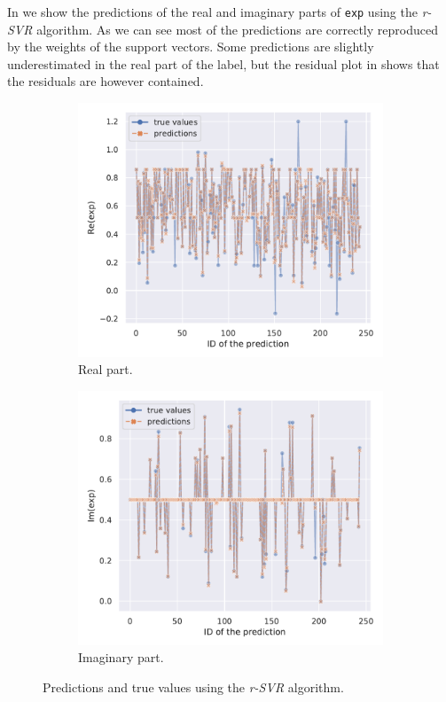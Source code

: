 In  we show the predictions of the real and imaginary parts of \texttt{exp} using the \emph{r-SVR} algorithm.
As we can see most of the predictions are correctly reproduced by the weights of the support vectors.
Some predictions are slightly underestimated in the real part of the label, but the residual plot in  shows that the residuals are however contained.

\begin{figure}[htbp]
  \centering
  \begin{subfigure}{0.45\textwidth}
    \centering
    \includegraphics[width=\linewidth]{img/svr_test_exp_re_plot}
    \caption{Real part.}
  \end{subfigure}
  \begin{subfigure}{0.45\textwidth}
    \centering
    \includegraphics[width=\linewidth]{img/svr_test_exp_im_plot}
    \caption{Imaginary part.}
  \end{subfigure}
  \caption{Predictions and true values using the \emph{r-SVR} algorithm.}
  \label{fig:agg:svr_pred}
\end{figure}

